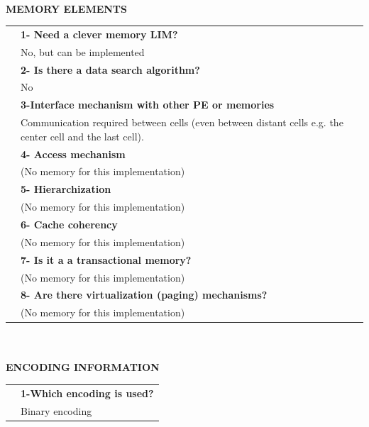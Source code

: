 \newpage{\large \textbf{\qquad }}\vspace{10pt}\\
{\large \textbf{MEMORY ELEMENTS}}\vspace{10pt}\\\begin{tabular}{ p{0.2cm} p{14.5cm}}
&\textbf{1- Need a clever memory LIM?}\\
&	No, but can be implemented\vspace{7pt}\\
&\textbf{2- Is there a data search algorithm?}\\
&	No\vspace{7pt}\\
&\textbf{	3-Interface mechanism with other PE or memories}\\
&	Communication required between cells (even between distant cells e.g. the center cell and the last cell).\vspace{7pt}\\
&	\textbf{4- Access mechanism}\\
&	(No memory for this implementation)\vspace{7pt}\\
&	\textbf{5- Hierarchization} \\
&	(No memory for this implementation)\vspace{7pt}\\
&\textbf{	6- Cache coherency} \\
&	(No memory for this implementation)\vspace{7pt}\\
&\textbf{	7- Is it a a transactional memory?}\\
&	(No memory for this implementation)\vspace{7pt}\\
&\textbf{	8- Are there virtualization (paging) mechanisms?}\\
&	(No memory for this implementation)\end{tabular}\vspace{14pt}\\
\vspace{10pt}\\
{\large\textbf{ENCODING INFORMATION}}\vspace{10pt}\\
\begin{tabular}{ p{0.2cm} p{14.5cm}}
	&\textbf{1-Which encoding is used?}\\
	&Binary encoding
\end{tabular}
